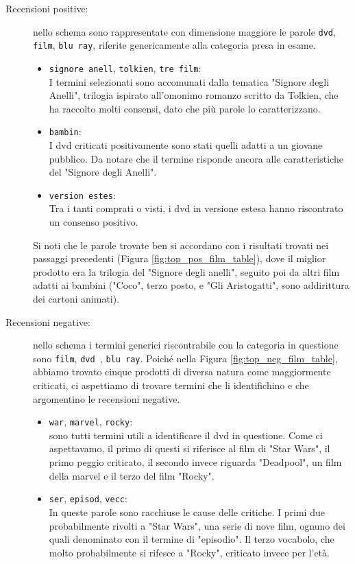 				\begin{description}
				\item[Recensioni positive:]
				nello schema sono rappresentate con dimensione maggiore le parole \verb|dvd|, \verb|film|, \verb|blu ray|, riferite genericamente alla categoria presa in esame. 	
				\begin{itemize}
					\item \texttt{signore anell}, \texttt{tolkien}, \texttt{tre film}: \\
					I termini selezionati sono accomunati dalla tematica "Signore degli Anelli", trilogia ispirato all'omonimo romanzo scritto da Tolkien, che ha raccolto molti consensi, dato che più parole lo caratterizzano.
					\item \texttt{bambin}: \\
					I dvd criticati positivamente sono stati quelli adatti a un giovane pubblico. Da notare che il termine risponde ancora alle caratteristiche del "Signore degli Anelli".
					\item \texttt{version estes}: \\
					Tra i tanti comprati o visti, i dvd in versione estesa hanno riscontrato un consenso positivo.
				\end{itemize}	
			
				Si noti che le parole trovate ben si accordano con i risultati trovati nei passaggi precedenti (Figura \ref{fig:top_pos_film_table}), dove il miglior prodotto era la trilogia del "Signore degli anelli", seguito poi da altri film adatti ai bambini ("Coco", terzo posto, e "Gli Aristogatti", sono addirittura dei cartoni animati).
				
				\item[Recensioni negative:] 
				nello schema i termini generici riscontrabile con la categoria in questione sono \verb|film|, \verb|dvd |, \verb|blu ray|. Poiché nella Figura \ref{fig:top_neg_film_table}, abbiamo trovato cinque prodotti di diversa natura come maggiormente criticati, ci aspettiamo di trovare termini che li identifichino e che argomentino le recensioni negative.
				\begin{itemize}
					\item \texttt{war}, \texttt{marvel}, \texttt{rocky}: \\
					sono tutti termini utili a identificare il dvd in questione. Come ci aspettavamo, il primo di questi si riferisce al film di "Star Wars", il primo peggio criticato, il secondo invece riguarda "Deadpool", un film della marvel e il terzo del film "Rocky". 
					\item \texttt{ser}, \texttt{episod}, \texttt{vecc}: \\
					In queste parole sono racchiuse le cause delle critiche. I primi due probabilmente rivolti a "Star Wars", una serie di nove film, ognuno dei quali denominato con il termine di "episodio". Il terzo vocabolo, che molto probabilmente si rifesce a "Rocky", criticato invece per l'età.		
				\end{itemize}
			\end{description}
		
		